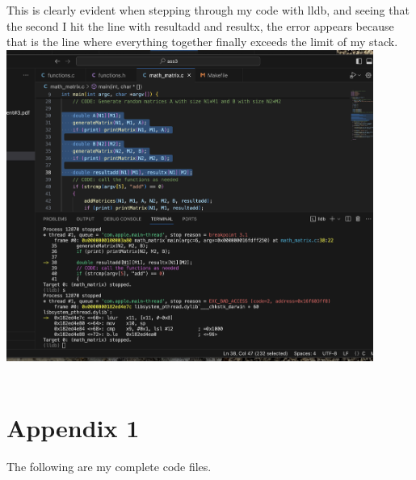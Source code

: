 \documentclass{article}
\begin{document}
This is clearly evident when stepping through my code with lldb, and seeing that the second I hit the line with resultadd and resultx, the error appears because that is the line where everything together finally exceeds the limit of my stack. 
\\
\includegraphics[width = 12cm]{lldb.png}
\\
\\
\section{Appendix 1}

The following are my complete code files. 
\end{document}
